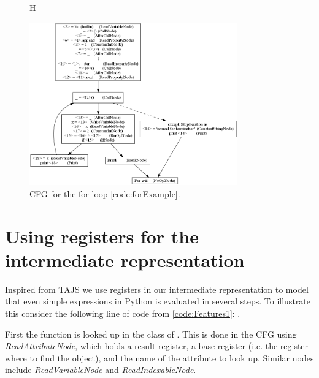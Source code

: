 \begin{figure}{H}
  \begin{center}
    \includegraphics[width=0.8\textwidth]{images/for-example-cfg2.png}
  \end{center}
  \caption{CFG for the for-loop \autoref{code:forExample}.}
  \label{fig:forCfg}
\end{figure}





\section{Using registers for the intermediate representation}
\label{CFG calls}
Inspired from TAJS \cite{tajs} we use registers in our intermediate representation to model that even simple expressions in Python is evaluated in several steps. To illustrate this consider the following line of code from \autoref{code:Features1}: .

First the function  is looked up in the class of . This is done in the CFG using \textit{ReadAttributeNode}, which holds a result register, a base register (i.e. the register where to find the object), and the name of the attribute to look up. Similar nodes include \textit{ReadVariableNode} and \textit{ReadIndexableNode}.

